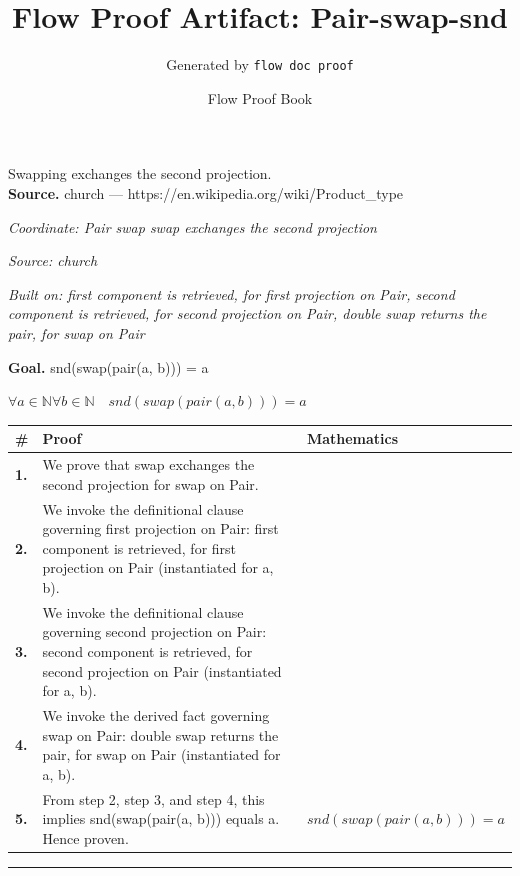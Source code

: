 \documentclass[11pt]{article}
\title{Flow Proof Artifact: Pair-swap-snd}
\author{Generated by \texttt{flow doc proof}}
\date{Flow Proof Book}
\theoremstyle{definition}
\begin{document}
\maketitle
Swapping exchanges the second projection.\\[0.5em]
\textbf{Source.} church — https://en.wikipedia.org/wiki/Product\_type\\[0.5em]
\bigskip
{}\par
\smallskip\noindent\textit{Coordinate: Pair \cdot swap \cdot swap exchanges the second projection}\par
\smallskip\noindent\textit{Source: church}\par
\smallskip\noindent\textit{Built on: first component is retrieved, for first projection on Pair, second component is retrieved, for second projection on Pair, double swap returns the pair, for swap on Pair}\par
\medskip
\noindent\textbf{Goal.} snd(swap(pair(a, b))) = a\par
\noindent$\displaystyle \forall a \in \mathbb{N} \forall b \in \mathbb{N}\quad snd(swap(pair(a, b))) = a$\par
\medskip
\noindent
\begin{tabular}{@{} >{\raggedright\arraybackslash}p{} >{\raggedright\arraybackslash}p{} >{\raggedleft\arraybackslash}p{} @{}}
\textbf{\#} & \textbf{Proof} & \textbf{Mathematics} \\
\midrule
\textbf{1.} & We prove that swap exchanges the second projection for swap on Pair. & \\[0.45em]
\textbf{2.} & We invoke the definitional clause governing first projection on Pair: first component is retrieved, for first projection on Pair (instantiated for a, b). & \\[0.45em]
\textbf{3.} & We invoke the definitional clause governing second projection on Pair: second component is retrieved, for second projection on Pair (instantiated for a, b). & \\[0.45em]
\textbf{4.} & We invoke the derived fact governing swap on Pair: double swap returns the pair, for swap on Pair (instantiated for a, b). & \\[0.45em]
\textbf{5.} & From step 2, step 3, and step 4, this implies snd(swap(pair(a, b))) equals a. Hence proven. & $\displaystyle snd(swap(pair(a, b))) = a$ \\[0.45em]
\bottomrule
\end{tabular}
\label{thm:Pair-swap-swap_exchanges_the_second_projection}
\par\medskip\hrule
\end{document}
